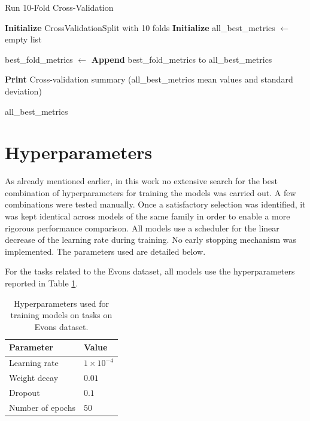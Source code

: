 \documentclass[a4paper,twoside,12pt]{book}
\begin{document}
\begin{algorithm}[H]
	\caption{Run 10-Fold Cross-Validation}
	\begin{algorithmic}
		
		\Statex \vspace{0.5em}
		\State \textbf{Initialize} CrossValidationSplit with 10 folds
		\State \textbf{Initialize} all\_best\_metrics $\gets$ empty list
		
		\Statex \vspace{0.5em}
		\State best\_fold\_metrics $\gets$ 
		\State \textbf{Append} best\_fold\_metrics to all\_best\_metrics
		\EndFor
		
		\Statex \vspace{0.5em}
		\State \textbf{Print} Cross-validation summary (all\_best\_metrics mean values and standard deviation)
		
		\State \Return all\_best\_metrics
		\EndFunction
	\end{algorithmic}
\end{algorithm}

\section*{Hyperparameters}

As already mentioned earlier, in this work no extensive search for the best combination of hyperparameters for training the models was carried out. A few combinations were tested manually. Once a satisfactory selection was identified, it was kept identical across models of the same family in order to enable a more rigorous performance comparison. All models use a scheduler for the linear decrease of the learning rate during training. No early stopping mechanism was implemented. The parameters used are detailed below.

For the tasks related to the Evons dataset, all models use the hyperparameters reported in Table \ref{tab:mlp-hparams}.

\begin{table}[H]
	\centering
	\begin{tabular}{ll}
		\toprule
		\textbf{Parameter} & \textbf{Value} \\
		\midrule
		Learning rate & $1 \times 10^{-4}$ \\
		Weight decay & $0.01$ \\
		Dropout & $0.1$ \\
		Number of epochs & $50$ \\
		\bottomrule
	\end{tabular}
	\caption{Hyperparameters used for training models on tasks on Evons dataset.}
	\label{tab:mlp-hparams}
\end{table}
\end{document}
